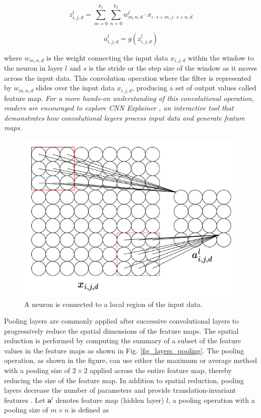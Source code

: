 \documentclass[preprint,12pt]{elsarticle}
\begin{document}
\begin{equation}
z_{i,j,d}^l=\sum_{m=0}^{k_1} \sum_{n=0}^{k_2} w_{m,n,d}^{l} \cdot x_{i\cdot s +m,j\cdot s+n,d}
\end{equation}

\begin{equation}
a_{i,j,d}^l=g(z_{i,j,d}^l)
\end{equation}

\noindent where $w_{m,n,d}$ is the weight connecting the input data $x_{i,j,d}$ within the window to the neuron in layer $l$ and $s$ is the stride or the step size of the window as it moves across the input data. This convolution operation where the filter is represented by $w_{m,n,d}$ slides over the input data $x_{i,j,d}$, producing a set of output values called feature map. \emph{For a more hands-on understanding of this convolutional operation, readers are encouraged to explore CNN Explainer \citep{noauthor_poloclubcnn-explainer_2025}, an interactive tool that demonstrates how convolutional layers process input data and generate feature maps.}

\begin{figure}[h!]
\centering
\includegraphics[scale=0.4]{fig_layers_convolution.png}
\caption{A neuron is connected to a local region of the input data.}
\label{fig_layers_convolution}
\end{figure}

Pooling layers are commonly applied after successive convolutional layers to progressively reduce the spatial dimensions of the feature maps. The spatial reduction is performed by computing the summary of a subset of the feature values in the feature maps as shown in Fig. \ref{fig_layers_pooling}. The pooling operation, as shown in the figure, can use either the maximum or average method with a pooling size of $2 \times 2$ applied across the entire feature map, thereby reducing the size of the feature map. In addition to spatial reduction, pooling layers decrease the number of parameters and provide translation-invariant features \citep{lecun_deep_2015}. Let $\mathbf{a}^l$ denotes feature map (hidden layer) $l$, a pooling operation with a pooling size of $m \times n$ is defined as
\end{document}
